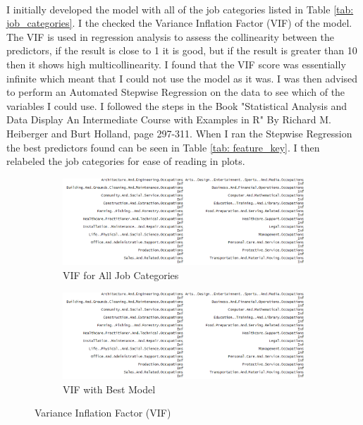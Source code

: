 \documentclass{article}
\begin{document}
\paragraph{}I initially developed the model with all of the job categories listed in Table \ref{tab: job_categories}. I the checked the Variance Inflation Factor (VIF) of the model. The VIF is used in regression analysis to assess the collinearity between the predictors, if the result is close to 1 it is good, but if the result is greater than 10 then it shows high multicollinearity. I found that the VIF score was essentially infinite which meant that I could not use the model as it was. I was then advised to perform an Automated Stepwise Regression on the data to see which of the variables I could use. I followed the steps in the Book "Statistical Analysis and Data Display An Intermediate Course with Examples in R" By Richard M. Heiberger and Burt Holland, page 297-311. When I ran the Stepwise Regression the best predictors found can be seen in Table \ref{tab: feature_key}. I then relabeled the job categories for ease of reading in plots.

\begin{figure}[H]
    \centering
    \begin{subfigure}[b]{.3\linewidth}
    \includegraphics[width =\linewidth]{images/InfVif.PNG}
    \caption{VIF for All Job Categories}
    \label{fig:infVif}
    \end{subfigure}
    \begin{subfigure}[b]{.6\linewidth}
    \includegraphics[width =\linewidth]{images/InfVif.PNG}
    \caption{VIF with Best Model}
    \label{fig:bestVIF}
    \end{subfigure}
    \caption{Variance Inflation Factor (VIF)}
    \label{fig:vif}
\end{figure}
\end{document}

